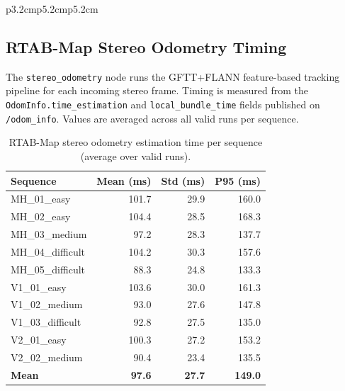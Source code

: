 \documentclass[11pt]{article}
\begin{document}
\begin{table}[ht]
\begin{tabular}{p{3.2cm}p{5.2cm}p{5.2cm}}
\subsection{RTAB-Map Stereo Odometry Timing}

The \texttt{stereo\_odometry} node runs the GFTT+FLANN feature-based tracking pipeline for each incoming stereo frame. Timing is measured from the \texttt{OdomInfo.time\_estimation} and \texttt{local\_bundle\_time} fields published on \texttt{/odom\_info}. Values are averaged across all valid runs per sequence.

\begin{table}[H]
\centering
\small
\caption{RTAB-Map stereo odometry estimation time per sequence (average over valid runs).}
\label{tab:rtabmap_timing_odom}
\begin{tabular}{lrrr}
\toprule
Sequence & Mean (ms) & Std (ms) & P95 (ms) \\
\midrule
MH\_01\_easy       & 101.7 & 29.9 & 160.0 \\
MH\_02\_easy       & 104.4 & 28.5 & 168.3 \\
MH\_03\_medium     & 97.2  & 28.3 & 137.7 \\
MH\_04\_difficult  & 104.2 & 30.3 & 157.6 \\
MH\_05\_difficult  & 88.3  & 24.8 & 133.3 \\
V1\_01\_easy       & 103.6 & 30.0 & 161.3 \\
V1\_02\_medium     & 93.0  & 27.6 & 147.8 \\
V1\_03\_difficult  & 92.8  & 27.5 & 135.0 \\
V2\_01\_easy       & 100.3 & 27.2 & 153.2 \\
V2\_02\_medium     & 90.4  & 23.4 & 135.5 \\
\midrule
\textbf{Mean}      & \textbf{97.6} & \textbf{27.7} & \textbf{149.0} \\
\bottomrule
\end{tabular}
\end{table}


\end{tabular}
\end{table}
\end{document}
